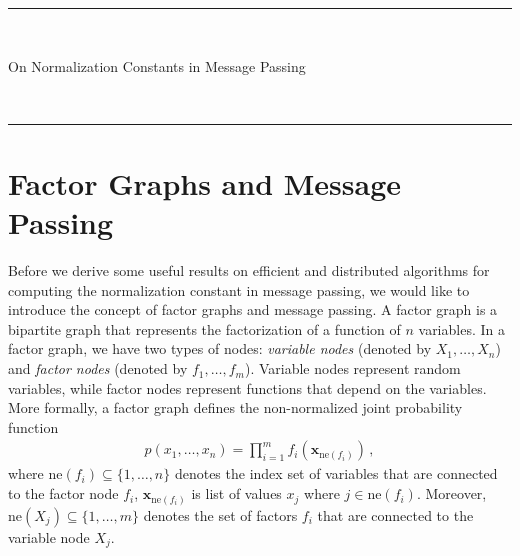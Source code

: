 \documentclass[a4paper]{article}
\newcommand{\bs}[1]{\boldsymbol{#1}}
\newcommand{\neighbours}[1]{{\mathrm{ne} \left( {#1} \right)}}
\theoremstyle{definition}
\begin{document}
\fancyhead[C]{}
\hrule \medskip
\begin{minipage}{0.295\textwidth}
    \raggedright
    \hfill\\
\end{minipage}
\begin{minipage}{0.4\textwidth}
    \centering
    \large
    On Normalization Constants in Message Passing\\
\end{minipage}
\begin{minipage}{0.295\textwidth}
    \raggedleft
    \hfill\\
\end{minipage}
\medskip\hrule
\bigskip
 
\section*{Factor Graphs and Message Passing}

Before we derive some useful results on efficient and distributed algorithms for computing the normalization constant in message passing, we would like to introduce the concept of factor graphs and message passing. A factor graph is a bipartite graph that represents the factorization of a function of $n$ variables. In a factor graph, we have two types of nodes: {\em variable nodes} (denoted by $X_1,\ldots,X_n$) and {\em factor nodes} (denoted by $f_1,\ldots,f_m$). Variable nodes represent random variables, while factor nodes represent functions that depend on the variables. More formally, a factor graph defines the non-normalized joint probability function 
\begin{align}
    p(x_1,\ldots,x_n) = \prod_{i=1}^m f_i(\bs{x}_{\neighbours{f_i}}) \,, \label{eq:joint}
\end{align}
where $\neighbours{f_i} \subseteq \{1,\ldots,n\}$ denotes the index set of variables that are connected to the factor node $f_i$, $\bs{x}_{\neighbours{f_i}}$ is list of values $x_j$ where $j \in \neighbours{f_i}$. Moreover, $\neighbours{X_j} \subseteq \{1,\ldots,m\}$ denotes the set of factors $f_i$ that are connected to the variable node $X_j$.
\end{document}
